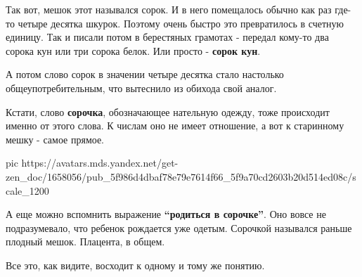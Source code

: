 Так вот, мешок этот назывался сорок. И в него помещалось обычно как раз где-то
четыре десятка шкурок. Поэтому очень быстро это превратилось в счетную единицу.
Так и писали потом в берестяных грамотах - передал кому-то два сорока кун или
три сорока белок. Или просто - \textbf{сорок кун}.

А потом слово сорок в значении четыре десятка стало настолько
общеупотребительным, что вытеснило из обихода свой аналог.

Кстати, слово \textbf{сорочка}, обозначающее нательную одежду, тоже происходит
именно от этого слова. К числам оно не имеет отношение, а вот к старинному
мешку - самое прямое.

\ifcmt
pic https://avatars.mds.yandex.net/get-zen_doc/1658056/pub_5f986d4dbaf78e79e7614f66_5f9a70cd2603b20d514ed08c/scale_1200
\fi

А еще можно вспомнить выражение \textbf{\enquote{родиться в сорочке}}. Оно вовсе не
подразумевало, что ребенок рождается уже одетым. Сорочкой назывался раньше
плодный мешок. Плацента, в общем.

Все это, как видите, восходит к одному и тому же понятию.
